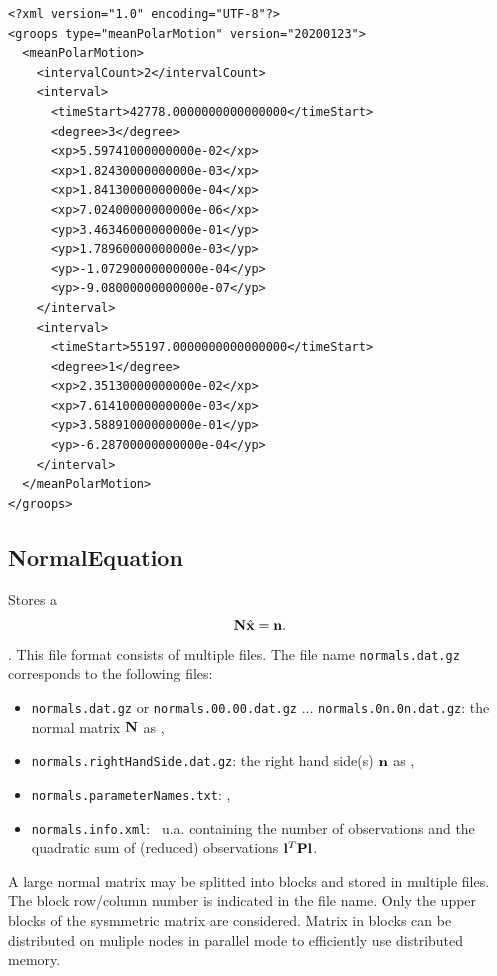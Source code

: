 \begin{verbatim}
<?xml version="1.0" encoding="UTF-8"?>
<groops type="meanPolarMotion" version="20200123">
  <meanPolarMotion>
    <intervalCount>2</intervalCount>
    <interval>
      <timeStart>42778.0000000000000000</timeStart>
      <degree>3</degree>
      <xp>5.59741000000000e-02</xp>
      <xp>1.82430000000000e-03</xp>
      <xp>1.84130000000000e-04</xp>
      <xp>7.02400000000000e-06</xp>
      <yp>3.46346000000000e-01</yp>
      <yp>1.78960000000000e-03</yp>
      <yp>-1.07290000000000e-04</yp>
      <yp>-9.08000000000000e-07</yp>
    </interval>
    <interval>
      <timeStart>55197.0000000000000000</timeStart>
      <degree>1</degree>
      <xp>2.35130000000000e-02</xp>
      <xp>7.61410000000000e-03</xp>
      <yp>3.58891000000000e-01</yp>
      <yp>-6.28700000000000e-04</yp>
    </interval>
  </meanPolarMotion>
</groops>
\end{verbatim}


\subsection{NormalEquation}\label{general.fileFormat:normalEquation}
Stores a 
\begin{equation}
  \mathbf{N} \hat{\mathbf{x}} = \mathbf{n}.
\end{equation}.
This file format consists of multiple files.
The file name \verb|normals.dat.gz| corresponds to the following files:
\begin{itemize}
\item \verb|normals.dat.gz| or \verb|normals.00.00.dat.gz| ... \verb|normals.0n.0n.dat.gz|:
      the normal matrix $\mathbf{N}$ as ,
\item \verb|normals.rightHandSide.dat.gz|:
      the right hand side(s) $\mathbf{n}$ as ,
\item \verb|normals.parameterNames.txt|: ,
\item \verb|normals.info.xml|:
\     u.a. containing the number of observations and the quadratic sum of (reduced) observations $\mathbf{l}^T\mathbf{P}\mathbf{l}$.
\end{itemize}
A large normal matrix may be splitted into blocks and stored in multiple files.
The block row/column number is indicated in the file name.
Only the upper blocks of the sysmmetric matrix are considered.
Matrix in blocks can be distributed on muliple nodes in parallel mode to efficiently use distributed memory.


